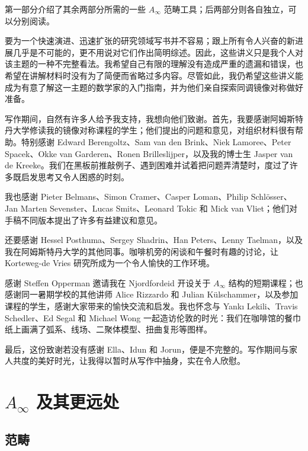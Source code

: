 \documentclass[lang=cn,cm,11pt,scheme=chinese]{elegantbook}
\begin{document}
第一部分介绍了其余两部分所需的一些 $A_\infty$ 范畴工具；后两部分则各自独立，可以分别阅读。

要为一个快速演进、迅速扩张的研究领域写书并不容易；跟上所有令人兴奋的新进展几乎是不可能的，更不用说对它们作出简明综述。因此，这些讲义只是我个人对该主题的一种不完整看法。我希望自己有限的理解没有造成严重的遗漏和错误，也希望在讲解材料时没有为了简便而省略过多内容。尽管如此，我仍希望这些讲义能成为有意了解这一主题的数学家的入门指南，并为他们亲自探索同调镜像对称做好准备。

写作期间，自然有许多人给予我支持，我想向他们致谢。首先，我要感谢阿姆斯特丹大学修读我的镜像对称课程的学生；他们提出的问题和意见，对组织材料很有帮助。特别感谢 Edward Berengoltz、Sam van den Brink、Niek Lamoree、Peter Spacek、Okke van Garderen、Ronen Brilleslijper，以及我的博士生 Jasper van de Kreeke。我们在黑板前推敲例子、遇到困难并试着把问题弄清楚时，度过了许多既启发思考又令人困惑的时刻。

我也感谢 Pieter Belmans、Simon Cramer、Casper Loman、Philip Schlösser、Jan Marten Sevenster、Lucas Smits、Leonard Tokic 和 Mick van Vliet；他们对手稿不同版本提出了许多有益建议和意见。

还要感谢 Hessel Posthuma、Sergey Shadrin、Han Peters、Lenny Taelman，以及我在阿姆斯特丹大学的其他同事。咖啡机旁的闲谈和午餐时有趣的讨论，让 Korteweg-de Vries 研究所成为一个令人愉快的工作环境。

感谢 Steffen Opperman 邀请我在 Njordfordeid 开设关于 $A_\infty$ 结构的短期课程；也感谢同一暑期学校的其他讲师 Alice Rizzardo 和 Julian Külschammer，以及参加课程的学生，感谢大家带来的愉快交流和启发。我也怀念与 Yankı Lekili、Travis Schedler、Ed Segal 和 Michael Wong 一起造访伦敦的时光：我们在咖啡馆的餐巾纸上画满了弧系、线场、二聚体模型、扭曲复形等图样。

最后，这份致谢若没有感谢 Ella、Idun 和 Jorun，便是不完整的。写作期间与家人共度的美好时光，让我得以暂时从写作中抽身，实在令人欣慰。



\mainmatter
\part{\texorpdfstring{$A_\infty$}{A-infinity} 及其更远处}
\chapter{范畴}\label{ch:categories}




\end{document}
